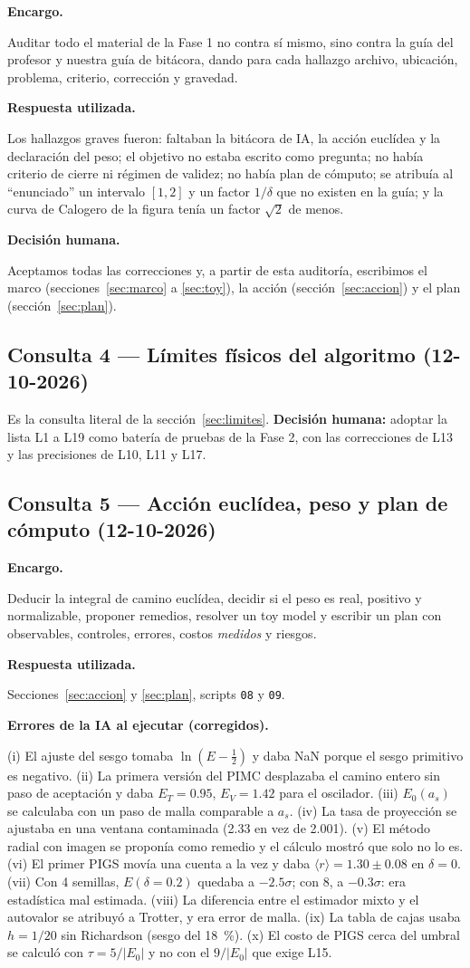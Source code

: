 \documentclass[11pt]{article}
\newcommand{\campo}[1]{\par\smallskip\textbf{#1}\par}
\begin{document}
\campo{Encargo.} Auditar todo el material de la Fase 1 no contra sí mismo, sino contra la guía del profesor y nuestra guía de bitácora, dando para cada hallazgo archivo, ubicación, problema, criterio, corrección y gravedad.

\campo{Respuesta utilizada.} Los hallazgos graves fueron: faltaban la bitácora de IA, la acción euclídea y la declaración del peso; el objetivo no estaba escrito como pregunta; no había criterio de cierre ni régimen de validez; no había plan de cómputo; se atribuía al ``enunciado'' un intervalo $[1,2]$ y un factor $1/\delta$ que no existen en la guía; y la curva de Calogero de la figura tenía un factor $\sqrt2$ de menos.

\campo{Decisión humana.} Aceptamos todas las correcciones y, a partir de esta auditoría, escribimos el marco (secciones~\ref{sec:marco} a \ref{sec:toy}), la acción (sección~\ref{sec:accion}) y el plan (sección~\ref{sec:plan}).

\subsection*{Consulta 4 --- Límites físicos del algoritmo (12-10-2026)}

Es la consulta literal de la sección~\ref{sec:limites}. \textbf{Decisión humana:} adoptar la lista L1 a L19 como batería de pruebas de la Fase 2, con las correcciones de L13 y las precisiones de L10, L11 y L17.

\subsection*{Consulta 5 --- Acción euclídea, peso y plan de cómputo (12-10-2026)}

\campo{Encargo.} Deducir la integral de camino euclídea, decidir si el peso es real, positivo y normalizable, proponer remedios, resolver un toy model y escribir un plan con observables, controles, errores, costos \emph{medidos} y riesgos.

\campo{Respuesta utilizada.} Secciones~\ref{sec:accion} y \ref{sec:plan}, scripts \texttt{08} y \texttt{09}.

\campo{Errores de la IA al ejecutar (corregidos).} (i) El ajuste del sesgo tomaba $\ln(E-\tfrac12)$ y daba NaN porque el sesgo primitivo es negativo. (ii) La primera versión del PIMC desplazaba el camino entero sin paso de aceptación y daba $E_T=0.95$, $E_V=1.42$ para el oscilador. (iii) $E_0(a_s)$ se calculaba con un paso de malla comparable a $a_s$. (iv) La tasa de proyección se ajustaba en una ventana contaminada (2.33 en vez de 2.001). (v) El método radial con imagen se proponía como remedio y el cálculo mostró que solo no lo es. (vi) El primer PIGS movía una cuenta a la vez y daba $\langle r\rangle=1.30\pm0.08$ en $\delta=0$. (vii) Con 4 semillas, $E(\delta=0.2)$ quedaba a $-2.5\sigma$; con 8, a $-0.3\sigma$: era estadística mal estimada. (viii) La diferencia entre el estimador mixto y el autovalor se atribuyó a Trotter, y era error de malla. (ix) La tabla de cajas usaba $h=1/20$ sin Richardson (sesgo del 18~\%). (x) El costo de PIGS cerca del umbral se calculó con $\tau=5/|E_0|$ y no con el $9/|E_0|$ que exige L15.
\end{document}
